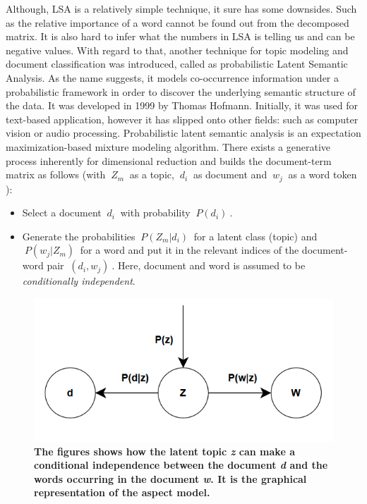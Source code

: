 \documentclass[12pt]{report}
\begin{document}
        Although, LSA is a relatively simple technique, it sure has some downsides. Such as the relative importance of a word cannot be found out from the decomposed matrix. 
        It is also hard to infer what the numbers in LSA is telling us and can be negative values. With regard to that, another technique for topic modeling and document classification
        was introduced, called as probabilistic Latent Semantic Analysis. As the name suggests, it models co-occurrence information under a probabilistic framework in order to 
        discover the underlying semantic structure of the data. It was developed in 1999 by Thomas Hofmann\cite{hofmann2013probabilistic}. Initially, it was used for text-based
        application, however it has slipped onto other fields: such as computer vision or audio processing. 
        Probabilistic latent semantic analysis is an expectation maximization-based mixture modeling algorithm\cite{aggarwal2015data}. There exists a generative process \cite{aggarwal2015data}
        inherently for dimensional reduction and builds the document-term matrix as follows (with $~{Z_m}~$ as a topic, $~{d_i}~$ as document and $~{w_j}~$ as a word token ):
        \begin{itemize}
            \item Select a document $~{d_i}~$ with probability $~{P(d_i)}~$.
            \item Generate the probabilities $~{P(Z_m|d_i)}~$ for a latent class (topic) and $~{P(w_j | Z_m)}~$ for a word and put it in the relevant indices of the document-word pair $~{(d_i, w_j)}~$. Here, 
            document and word is assumed to be \emph{conditionally independent}.

        \end{itemize}
        \begin{figure}[h]
            \centering
            \includegraphics[scale=0.5]{graphrep.png}
            \caption{\textbf{The figures shows how the latent topic \emph{z} can make a conditional independence between the 
            document \emph{d} and the words occurring in the document \emph{w}. It is the graphical representation of the aspect model.} }
        \end{figure}
\end{document}
